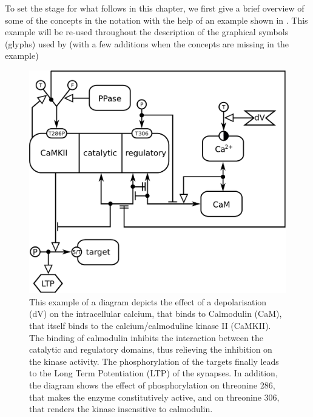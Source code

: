 
To set the stage for what follows in this chapter, we first give a brief overview of some of the concepts in the \ER notation with the help of an example shown in . This example will be re-used throughout the description of the graphical symbols (glyphs) used by \SBGNERLone (with a few additions when the concepts are missing in the example) 

\begin{figure}[H]
  \centering
  \vspace*{-0.75em}
  \includegraphics[scale=0.4]{examples/CaMKII-intro}
   \caption{This example of a \ER diagram depicts the effect of a depolarisation (dV) on the intracellular calcium, that binds to Calmodulin (CaM), that itself binds to the calcium/calmoduline kinase II (CaMKII). The binding of calmodulin inhibits the interaction between the catalytic and regulatory domains, thus relieving the inhibition on the kinase activity. The phosphorylation of the targets finally leads to the Long Term Potentiation (LTP) of the synapses. In addition, the diagram shows the effect of phosphorylation on threonine 286, that makes the enzyme constitutively active, and on threonine 306, that renders the kinase insensitive to calmodulin.}
  \label{fig:eg1}
\end{figure}
 
